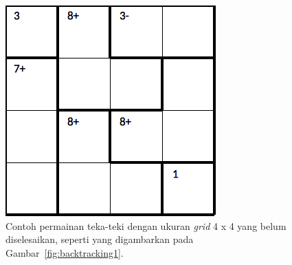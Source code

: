 \begin{figure}
\centering
\captionsetup{justification=centering}
\includegraphics[scale=0.333]{Gambar/backtracking/State1}
\caption[Contoh permainan teka-teki Calcudoku dengan ukuran \textit{grid} 4 x 4 yang belum diselesaikan, seperti yang digambarkan pada Gambar~\ref{fig:backtracking1}. ~\cite{fahda:16:backtracking}]{Contoh permainan teka-teki dengan ukuran \textit{grid} 4 x 4 yang belum diselesaikan, seperti yang digambarkan pada Gambar~\ref{fig:backtracking1}. ~\cite{fahda:16:backtracking}}
\label{fig:analisisbt1}
\end{figure}

